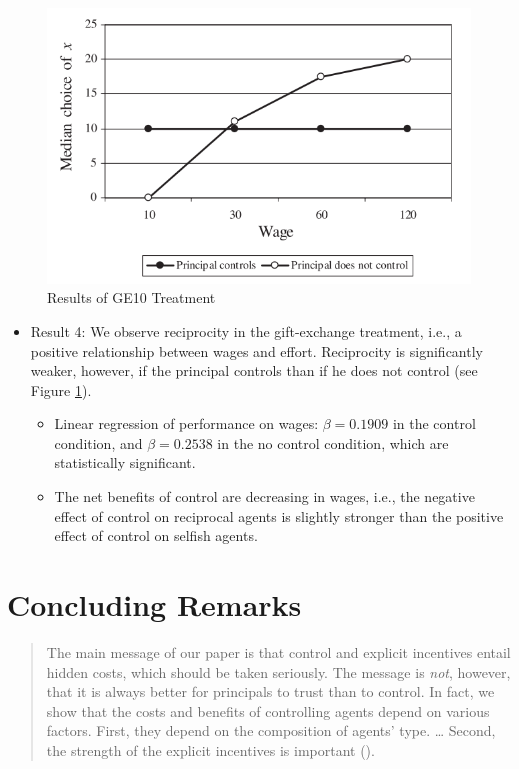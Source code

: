 \documentclass[../root]{subfiles}
\begin{document}
    \begin{figure}[h]
        \centering
        \includegraphics[width = 16cm]{0515kato/result4.png}
        \caption{Results of GE10 Treatment}
        \label{result4}
    \end{figure}

    \begin{itemize}
        \item Result 4: We observe reciprocity in the gift-exchange treatment, i.e., a positive relationship between wages and effort. Reciprocity is significantly weaker, however, if the principal controls than if he does not control (see Figure \ref{result4}).
        \begin{itemize}
            \item Linear regression of performance on wages: $\beta = 0.1909$ in the control condition, and $\beta = 0.2538$ in the no control condition, which are statistically significant.
            \item The net benefits of control are decreasing in wages, i.e., the negative effect of control on reciprocal agents is slightly stronger than the positive effect of control on selfish agents.
        \end{itemize}
    \end{itemize}

    \section{Concluding Remarks}

    \begin{quote}
        The main message of our paper is that control and explicit incentives entail hidden costs,
        which should be taken seriously.
        The message is \textit{not}, however, that it is always better for principals to trust than to control.
        In fact, we show that the costs and benefits of controlling agents depend on various factors.
        First, they depend on the composition of agents' type.
        \dots
        Second, the strength of the explicit incentives is important (\citealp[p.1628]{Falk2006}).
    \end{quote}

    \biblio
\end{document}
